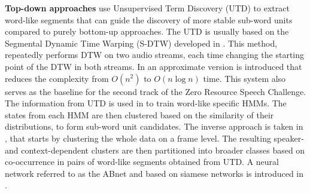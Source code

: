 \textbf{Top-down approaches} %
 use Unsupervised Term Discovery (UTD) to extract word-like segments that can guide the discovery of more stable sub-word units compared to purely bottom-up approaches.
The UTD is usually based on the Segmental Dynamic Time Warping (S-DTW) developed in \parencite{park2008unsupervised}.
This method, repeatedly performs DTW on two audio streams, each time changing the starting point of the DTW in both streams.
In \parencite{jansen2011efficient} an approximate version is introduced that reduces the complexity from $O(n^2)$ to $O(n \log n)$ time.
This system also serves as the baseline for the second track of the Zero Resource Speech Challenge. %
The information from UTD is used in \parencite{jansen2011towards} to train word-like specific HMMs.
The states from each HMM are then clustered based on the similarity of their distributions, to form sub-word unit candidates.
The inverse approach is taken in \parencite{jansen2013weak}, that starts by clustering the whole data on a frame level. %
The resulting speaker- and context-dependent clusters are then partitioned into broader classes based on co-occurrence in pairs of word-like segments obtained from UTD. %
A neural network referred to as the ABnet and based on siamese networks \parencite{bromley1994signature} is introduced in \parencite{synnaeve2014phonetics}.
